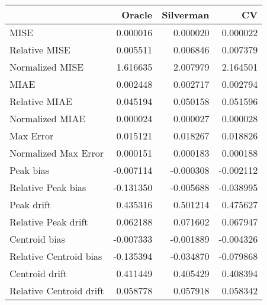 \begin{tabular}{lrrr}
  \hline
 & Oracle & Silverman & CV \\ 
  \hline
MISE & 0.000016 & 0.000020 & 0.000022 \\ 
  Relative MISE & 0.005511 & 0.006846 & 0.007379 \\ 
  Normalized MISE & 1.616635 & 2.007979 & 2.164501 \\ 
  MIAE & 0.002448 & 0.002717 & 0.002794 \\ 
  Relative MIAE & 0.045194 & 0.050158 & 0.051596 \\ 
  Normalized MIAE & 0.000024 & 0.000027 & 0.000028 \\ 
  Max Error & 0.015121 & 0.018267 & 0.018826 \\ 
  Normalized Max Error & 0.000151 & 0.000183 & 0.000188 \\ 
  Peak bias & -0.007114 & -0.000308 & -0.002112 \\ 
  Relative Peak bias & -0.131350 & -0.005688 & -0.038995 \\ 
  Peak drift & 0.435316 & 0.501214 & 0.475627 \\ 
  Relative Peak drift & 0.062188 & 0.071602 & 0.067947 \\ 
  Centroid bias & -0.007333 & -0.001889 & -0.004326 \\ 
  Relative Centroid bias & -0.135394 & -0.034870 & -0.079868 \\ 
  Centroid drift & 0.411449 & 0.405429 & 0.408394 \\ 
  Relative Centroid drift & 0.058778 & 0.057918 & 0.058342 \\ 
   \hline
\end{tabular}
